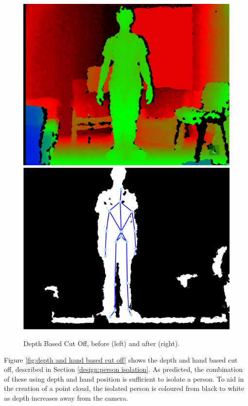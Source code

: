 \begin{figure}[h]
\begin{center}
\includegraphics[scale=0.4]{./design/parse1} 
\includegraphics[scale=0.4]{./design/parse2}
\end{center}
\caption{Depth Based Cut Off, before (left) and after (right).}
\label{fig:depth based cut off}
\end{figure} 

Figure \ref{fig:depth and hand based cut off} shows the depth and hand based cut off, described in Section \ref{design:person isolation}. As predicted, the combination of these using depth and hand position is sufficient to isolate a person. To aid in the creation of a point cloud, the isolated person is coloured from black to white as depth increases away from the camera.\\

